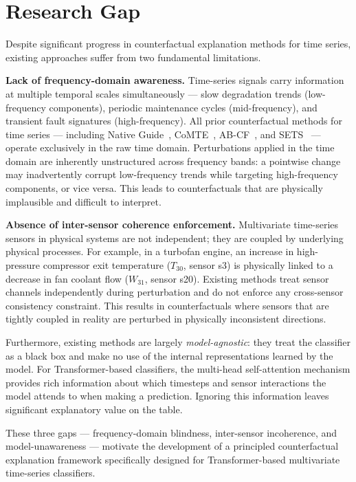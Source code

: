\section{Research Gap}

Despite significant progress in counterfactual explanation methods for time series, existing approaches suffer from two fundamental limitations.

\textbf{Lack of frequency-domain awareness.} Time-series signals carry information at multiple temporal scales simultaneously — slow degradation trends (low-frequency components), periodic maintenance cycles (mid-frequency), and transient fault signatures (high-frequency). All prior counterfactual methods for time series — including Native Guide~\cite{delaney2021instance}, CoMTE~\cite{ates2021counterfactual}, AB-CF~\cite{li2023abcf}, and SETS~\cite{bahri2022sets} — operate exclusively in the raw time domain. Perturbations applied in the time domain are inherently unstructured across frequency bands: a pointwise change may inadvertently corrupt low-frequency trends while targeting high-frequency components, or vice versa. This leads to counterfactuals that are physically implausible and difficult to interpret.

\textbf{Absence of inter-sensor coherence enforcement.} Multivariate time-series sensors in physical systems are not independent; they are coupled by underlying physical processes. For example, in a turbofan engine, an increase in high-pressure compressor exit temperature ($T_{30}$, sensor s3) is physically linked to a decrease in fan coolant flow ($W_{31}$, sensor s20). Existing methods treat sensor channels independently during perturbation and do not enforce any cross-sensor consistency constraint. This results in counterfactuals where sensors that are tightly coupled in reality are perturbed in physically inconsistent directions.

Furthermore, existing methods are largely \emph{model-agnostic}: they treat the classifier as a black box and make no use of the internal representations learned by the model. For Transformer-based classifiers, the multi-head self-attention mechanism provides rich information about which timesteps and sensor interactions the model attends to when making a prediction. Ignoring this information leaves significant explanatory value on the table.

These three gaps — frequency-domain blindness, inter-sensor incoherence, and model-unawareness — motivate the development of a principled counterfactual explanation framework specifically designed for Transformer-based multivariate time-series classifiers.

